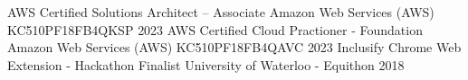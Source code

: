

\begin{cvhonors}

  \cvhonor
  {AWS Certified Solutions Architect – Associate} %
  {Amazon Web Services (AWS)} %
  {KC510PF18FB4QKSP} %
  {2023} %
  \cvhonor
  {AWS Certified Cloud Practioner - Foundation} %
  {Amazon Web Services (AWS)} %
  {KC510PF18FB4QAVC} %
  {2023} %
  \cvhonor
  {Inclusify Chrome Web Extension - Hackathon Finalist} %
  {University of Waterloo - Equithon} %
  {} %
  {2018} %
\end{cvhonors}
